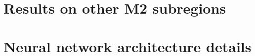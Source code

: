 \documentclass{article}
\begin{document}
\section{Results on other M2 subregions}
\label{sec:test_m2}



% 

\section{Neural network architecture details}
\label{sec:supp_nn_architecture}



\clearpage

\vskip 0.2in

\end{document}
